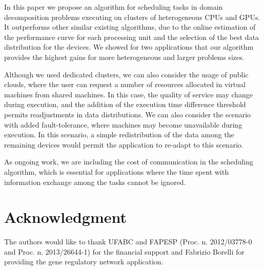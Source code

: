 \documentclass[journal]{IEEEtran}
\begin{document}
In this paper we propose an algorithm for scheduling tasks in domain
decomposition problems executing on clusters of heterogeneous CPUs and GPUs. It
outperforms other similar existing algorithms, due to the online estimation of
the performance curve for each processing unit and the selection of the best
data distribution for the devices. We showed for two applications that our
algorithm provides the highest gains for more heterogeneous and larger problems
sizes.

Although we used dedicated clusters, we can also consider the usage of public
clouds, where the user can request a number of resources allocated in virtual
machines from shared machines. In this case, the quality of service may change
during execution, and the addition of the execution time difference threshold
permits readjustments in data distributions. We can also consider the scenario
with added fault-tolerance, where machines may become unavailable during
execution. In this scenario, a simple redistribution of the data among the
remaining devices would permit the application to re-adapt to this scenario.

As ongoing work, we are including the cost of communication in the scheduling
algorithm, which is essential for applications where the time spent with
information exchange among the tasks cannot be ignored.

\section*{Acknowledgment}

The authors would like to thank UFABC and FAPESP (Proc. n. 2012/03778-0 and
Proc. n.  2013/26644-1) for the financial support and Fabrizio Borelli for
providing the gene regulatory network application.

\ifCLASSOPTIONcaptionsoff
  \newpage
\fi



%
%

\end{document}
